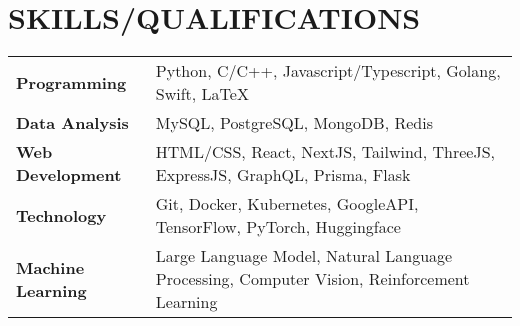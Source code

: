 \section{SKILLS/QUALIFICATIONS}

\small{
  \begin{tabularx}{\linewidth}{@{} p{3.5cm} X @{}}
    \textbf{Programming} & Python, C/C++, Javascript/Typescript, Golang, Swift, LaTeX \\
    \textbf{Data Analysis} & MySQL, PostgreSQL, MongoDB, Redis \\
    \textbf{Web Development} & HTML/CSS, React, NextJS, Tailwind, ThreeJS, ExpressJS, GraphQL, Prisma, Flask \\
    \textbf{Technology} & Git, Docker, Kubernetes, GoogleAPI, TensorFlow, PyTorch, Huggingface \\
    \textbf{Machine Learning} & Large Language Model, Natural Language Processing, Computer Vision, Reinforcement Learning \\
  \end{tabularx}
}